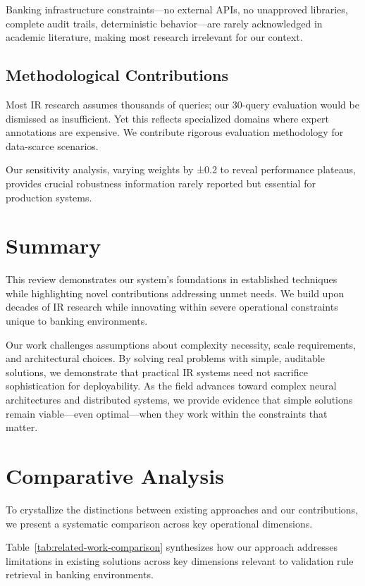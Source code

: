 Banking infrastructure constraints—no external APIs, no unapproved libraries, complete audit trails, deterministic behavior—are rarely acknowledged in academic literature, making most research irrelevant for our context.

\subsection{Methodological Contributions}

Most IR research assumes thousands of queries; our 30-query evaluation would be dismissed as insufficient. Yet this reflects specialized domains where expert annotations are expensive. We contribute rigorous evaluation methodology for data-scarce scenarios.

Our sensitivity analysis, varying weights by ±0.2 to reveal performance plateaus, provides crucial robustness information rarely reported but essential for production systems.

\section{Summary}

This review demonstrates our system's foundations in established techniques while highlighting novel contributions addressing unmet needs. We build upon decades of IR research while innovating within severe operational constraints unique to banking environments.

Our work challenges assumptions about complexity necessity, scale requirements, and architectural choices. By solving real problems with simple, auditable solutions, we demonstrate that practical IR systems need not sacrifice sophistication for deployability. As the field advances toward complex neural architectures and distributed systems, we provide evidence that simple solutions remain viable—even optimal—when they work within the constraints that matter.

\section{Comparative Analysis}
To crystallize the distinctions between existing approaches and our contributions, we present a systematic comparison across key operational dimensions.

Table~\ref{tab:related-work-comparison} synthesizes how our approach addresses limitations in existing solutions across key dimensions relevant to validation rule retrieval in banking environments.

